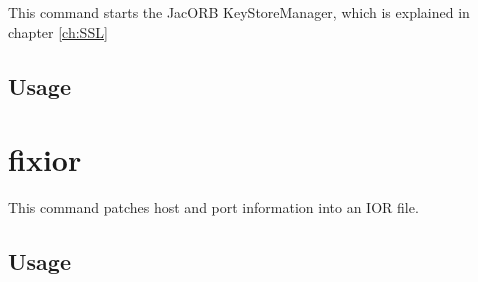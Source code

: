 This command starts the JacORB KeyStoreManager, which is explained in
chapter \ref{ch:SSL}

\subsection*{Usage}


\section{fixior}

This command patches host and port information into an IOR file.

\subsection*{Usage}



